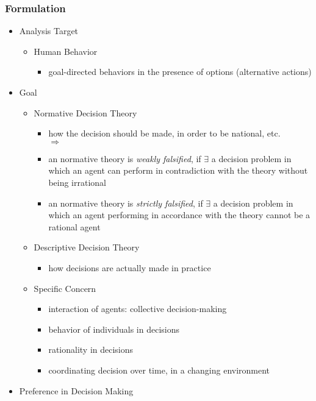 \subsubsection{Formulation}
\begin{itemize}
\item Analysis Target
	\begin{itemize}
	\item Human Behavior
		\begin{itemize}
		\item goal-directed behaviors in the presence of options (alternative actions)
		\end{itemize}
	\end{itemize}
\item Goal
	\begin{itemize}
	\item Normative Decision Theory
		\begin{itemize}
		\item how the decision should be made, in order to be national, etc. \\
		$\Rightarrow$
		\item an normative theory is \textit{weakly falsified}, if $\exists$ a decision problem in which an agent can perform in contradiction with the theory without being irrational
		\item an normative theory is \textit{strictly falsified}, if $\exists$ a decision problem in which an agent performing in accordance with the theory cannot be a rational agent
		\end{itemize}
	\item Descriptive Decision Theory
		\begin{itemize}
		\item how decisions are actually made in practice
		\end{itemize}
	\item Specific Concern
		\begin{itemize}
		\item interaction of agents: collective decision-making
		\item behavior of individuals in decisions
		\item rationality in decisions
		\item coordinating decision over time, in a changing environment
		\end{itemize}
	\end{itemize}
\item Preference in Decision Making
	\begin{itemize}

\end{itemize}
\end{itemize}
